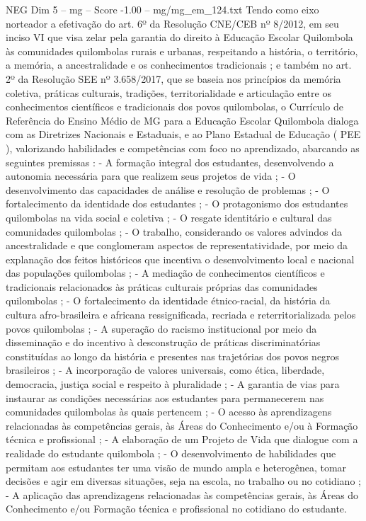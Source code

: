 \begin{textsample}{NEG Dim 5 – mg – Score -1.00 – mg/mg\_em\_124.txt}
Tendo como eixo norteador a efetivação do art. 6º da Resolução CNE/CEB nº 8/2012, em seu inciso VI que visa zelar pela garantia do direito à Educação Escolar Quilombola às comunidades quilombolas rurais e urbanas, respeitando a história, o território, a memória, a ancestralidade e os conhecimentos tradicionais ; e também no art. 2º da Resolução SEE nº 3.658/2017, que se baseia nos princípios da memória coletiva, práticas culturais, tradições, territorialidade e articulação entre os conhecimentos científicos e tradicionais dos povos quilombolas, o Currículo de Referência do Ensino Médio de MG para a Educação Escolar Quilombola dialoga com as Diretrizes Nacionais e Estaduais, e ao Plano Estadual de Educação ( PEE ), valorizando habilidades e competências com foco no aprendizado, abarcando as seguintes premissas : - A formação integral dos estudantes, desenvolvendo a autonomia necessária para que realizem seus projetos de vida ; - O desenvolvimento das capacidades de análise e resolução de problemas ; - O fortalecimento da identidade dos estudantes ; - O protagonismo dos estudantes quilombolas na vida social e coletiva ; - O resgate identitário e cultural das comunidades quilombolas ; - O trabalho, considerando os valores advindos da ancestralidade e que conglomeram aspectos de representatividade, por meio da explanação dos feitos históricos que incentiva o desenvolvimento local e nacional das populações quilombolas ; - A mediação de conhecimentos científicos e tradicionais relacionados às práticas culturais próprias das comunidades quilombolas ; - O fortalecimento da identidade étnico-racial, da história da cultura afro-brasileira e africana ressignificada, recriada e reterritorializada pelos povos quilombolas ; - A superação do racismo institucional por meio da disseminação e do incentivo à desconstrução de práticas discriminatórias constituídas ao longo da história e presentes nas trajetórias dos povos negros brasileiros ; - A incorporação de valores universais, como ética, liberdade, democracia, justiça social e respeito à pluralidade ; - A garantia de vias para instaurar as condições necessárias aos estudantes para permanecerem nas comunidades quilombolas às quais pertencem ; - O acesso às aprendizagens relacionadas às competências gerais, às Áreas do Conhecimento e/ou à Formação técnica e profissional ; - A elaboração de um Projeto de Vida que dialogue com a realidade do estudante quilombola ; - O desenvolvimento de habilidades que permitam aos estudantes ter uma visão de mundo ampla e heterogênea, tomar decisões e agir em diversas situações, seja na escola, no trabalho ou no cotidiano ; - A aplicação das aprendizagens relacionadas às competências gerais, às Áreas do Conhecimento e/ou Formação técnica e profissional no cotidiano do estudante.

\end{textsample}
